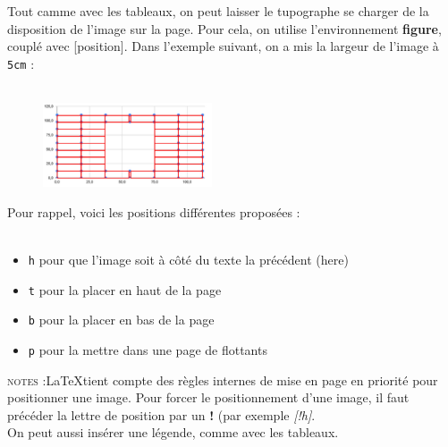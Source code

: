 \documentclass[a4paper, 10pt]{book}
\begin{document}
Tout camme avec les tableaux, on peut laisser le tupographe se charger de la disposition de l'image sur la page. Pour cela, on utilise l'environnement \textbf{figure}, couplé avec [position]. Dans l'exemple suivant, on a mis la largeur de l'image à \texttt{5cm} : \\ \\

\begin{figure}[h]
\includegraphics[width=5cm]{grapheHV}
\end{figure}

Pour rappel, voici les positions différentes proposées : \\ \\

\begin{itemize}
\item \texttt{h} pour que l'image soit à côté du texte la précédent (here)
\item \texttt{t} pour la placer en haut de la page
\item \texttt{b} pour la placer en bas de la page
\item \texttt{p} pour la mettre dans une page de flottants
\end{itemize}

\textsc{notes :}\LaTeX tient compte des règles internes de mise en page en priorité pour positionner une image. Pour forcer le positionnement d'une image, il faut précéder la lettre de position par un \textbf{!} (par exemple \textit{[!h]}. \\ On peut aussi insérer une légende, comme avec les tableaux.

\backmatter




\tableofcontents
\end{document}
